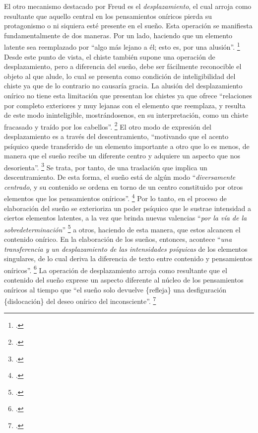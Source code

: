 El otro mecanismo destacado por Freud es el \emph{desplazamiento}, el cual arroja como resultante que aquello central en los pensamientos oníricos pierda su protagonismo o ni siquiera esté presente en el sueño. Esta operación se manifiesta fundamentalmente de dos maneras. Por un lado, haciendo que un elemento latente sea reemplazado por \enquote{algo más lejano a él; esto es, por una alusión}. \footcite[][187]{@7032-FREUD1969} Desde este punto de vista, el chiste también supone una operación de desplazamiento, pero a diferencia del sueño, debe ser fácilmente reconocible el objeto al que alude, lo cual se presenta como condición de inteligibilidad del chiste ya que de lo contrario no causaría gracia. La alusión del desplazamiento onírico no tiene esta limitación que presentan los chistes ya que ofrece \enquote{relaciones por completo exteriores y muy lejanas con el elemento que reemplaza, y resulta de este modo ininteligible, mostrándosenos, en su interpretación, como un chiste fracasado y traído por los cabellos}. \footcite[][187]{@7032-FREUD1969} El otro modo de expresión del desplazamiento es a través del descentramiento, \enquote{motivando que el acento psíquico quede transferido de un elemento importante a otro que lo es menos, de manera que el sueño recibe un diferente centro y adquiere un aspecto que nos desorienta}. \footcite[][187]{@7032-FREUD1969} Se trata, por tanto, de una traslación que implica un descentramiento. De esta forma, el sueño está de algún modo \enquote{\emph{diversamente centrado}, y su contenido se ordena en torno de un centro constituido por otros elementos que los pensamientos oníricos}. \footcite[][311]{@7031-FREUD2008} Por lo tanto, en el proceso de elaboración del sueño se exterioriza un poder psíquico que le sustrae intensidad a ciertos elementos latentes, a la vez que brinda nuevas valencias \enquote{\emph{por la vía de la sobredeterminación}} \footcite[][303]{@7031-FREUD2008} a otros, haciendo de esta manera, que estos alcancen el contenido onírico. En la elaboración de los sueños, entonces, acontece \enquote{\emph{una transferencia y un desplazamiento de las intensidades psíquicas} de los elementos singulares, de lo cual deriva la diferencia de texto entre contenido y pensamientos oníricos}. \footcite[][292]{@7031-FREUD2008} La operación de desplazamiento arroja como resultante que el contenido del sueño exprese un aspecto diferente al núcleo de los pensamientos oníricos al tiempo que \enquote{el sueño solo devuelve \{refleja\} una desfiguración \{dislocación\} del deseo onírico del inconsciente}. \footcite[][314]{@7031-FREUD2008}

